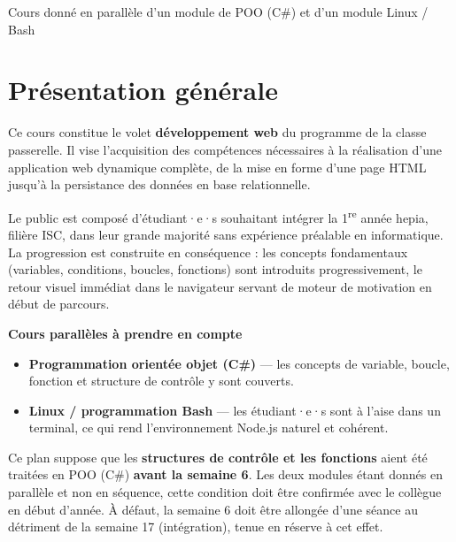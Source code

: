 \documentclass[a4paper,11pt]{article}
\begin{document}
\vspace{1.2cm}
\begin{center}
  \color{cfptDarkGrey}\small Cours donné en parallèle d'un module de POO (C\#) et d'un module Linux / Bash
\end{center}

\newpage

\tableofcontents
\newpage

\section{Présentation générale}

Ce cours constitue le volet \textbf{développement web} du programme de la classe passerelle. Il vise l'acquisition des compétences nécessaires à la réalisation d'une application web dynamique complète, de la mise en forme d'une page HTML jusqu'à la persistance des données en base relationnelle.

Le public est composé d'étudiant·e·s souhaitant intégrer la 1\textsuperscript{re} année hepia, filière ISC, dans leur grande majorité sans expérience préalable en informatique. La progression est construite en conséquence : les concepts fondamentaux (variables, conditions, boucles, fonctions) sont introduits progressivement, le retour visuel immédiat dans le navigateur servant de moteur de motivation en début de parcours.

\medskip
\noindent\textbf{Cours parallèles à prendre en compte}

\begin{itemize}
  \item \textbf{Programmation orientée objet (C\#)} — les concepts de variable, boucle, fonction et structure de contrôle y sont couverts.
  \item \textbf{Linux / programmation Bash} — les étudiant·e·s sont à l'aise dans un terminal, ce qui rend l'environnement Node.js naturel et cohérent.
\end{itemize}

\begin{tcolorbox}[alerte, title={Coordination nécessaire avec le module de POO}]
\small
Ce plan suppose que les \textbf{structures de contrôle et les fonctions} aient été traitées en POO (C\#) \textbf{avant la semaine 6}. Les deux modules étant donnés en parallèle et non en séquence, cette condition doit être confirmée avec le collègue en début d'année. À défaut, la semaine 6 doit être allongée d'une séance au détriment de la semaine 17 (intégration), tenue en réserve à cet effet.
\end{tcolorbox}
\end{document}
